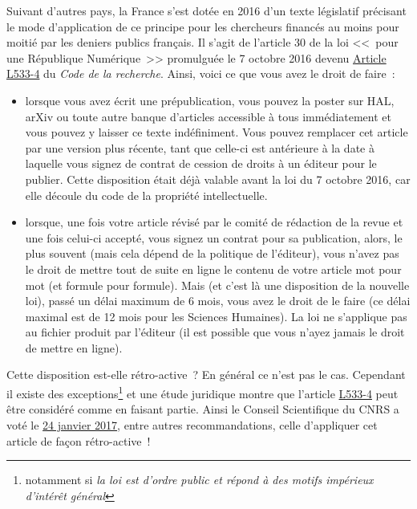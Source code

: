 Suivant d'autres pays, la France s'est dot{\'e}e en 2016 d'un texte l{\'e}gislatif pr{\'e}cisant le mode d'application de ce principe pour les chercheurs financ{\'e}s
au moins pour moiti{\'e} par les deniers publics fran{\c c}ais. Il s'agit de l'article 30 de la loi <<~pour une R{\'e}publique Num{\'e}rique~>> promulgu{\'e}e le 7 octobre 2016
devenu \href{https://www.legifrance.gouv.fr/affichCodeArticle.do;jsessionid=B2842ED6626DE6921F9FD32EA69A3C93.tpdila15v_2?idArticle=LEGIARTI000033205794&cidTexte=LEGITEXT000006071190&dateTexte=20170124}{Article L533-4}
du \emph{Code de la recherche}.
Ainsi, voici ce que vous avez le droit de faire~:
\begin{itemize}
\item lorsque vous avez {\'e}crit une pr{\'e}publication, vous pouvez la poster sur HAL, arXiv ou toute autre banque d'articles accessible {\`a} tous imm{\'e}diatement
et vous pouvez y laisser ce texte ind{\'e}finiment. Vous pouvez remplacer cet article par une version plus r{\'e}cente, tant que celle-ci est ant{\'e}rieure {\`a} la date
{\`a} laquelle vous signez de contrat de cession de droits {\`a} un {\'e}diteur pour le publier. Cette disposition {\'e}tait d{\'e}j{\`a} valable avant la loi du 7 octobre 2016,
car elle d{\'e}coule du code de la propri{\'e}t{\'e} intellectuelle.
\item lorsque, une fois votre article r{\'e}vis{\'e} par le comit{\'e} de r{\'e}daction de la revue et une fois celui-ci accept{\'e}, vous signez un contrat pour sa publication,
alors, le plus souvent (mais cela d{\'e}pend de la politique de l'{\'e}diteur), vous n'avez pas le droit de mettre tout de suite en ligne le contenu de votre article
mot pour mot (et formule pour formule). Mais (et c'est l{\`a} une disposition de la nouvelle loi), pass{\'e} un d{\'e}lai maximum de 6 mois, vous avez le droit de le faire
(ce d{\'e}lai maximal est de 12 mois pour les Sciences Humaines). La loi ne s'applique pas  au fichier produit par l'{\'e}diteur (il est possible que vous n'ayez
jamais le droit de mettre en ligne).
\end{itemize}

\noindent
Cette disposition est-elle r{\'e}tro-active~? 
En g{\'e}n{\'e}ral ce n'est pas le cas. Cependant il existe des exceptions\footnote{notamment si
\emph{la loi est d'ordre public et r{\'e}pond {\`a} des motifs imp{\'e}rieux d'int{\'e}r{\^e}t g{\'e}n{\'e}ral}}
et une {\'e}tude juridique montre que l'article
\href{https://www.legifrance.gouv.fr/affichCodeArticle.do;jsessionid=B2842ED6626DE6921F9FD32EA69A3C93.tpdila15v_2?idArticle=LEGIARTI000033205794&cidTexte=LEGITEXT000006071190&dateTexte=20170124}{L533-4}
peut {\^e}tre consid{\'e}r{\'e} comme en faisant partie. Ainsi
le Conseil Scientifique du CNRS a vot{\'e} le \href{http://www.cnrs.fr/comitenational/doc/recommandations/2017/Reco_Interpetation_de_la_loi_numerique.pdf}{24 janvier 2017}, entre autres
recommandations, celle d'appliquer cet article 
de fa{\c c}on r{\'e}tro-active~!


